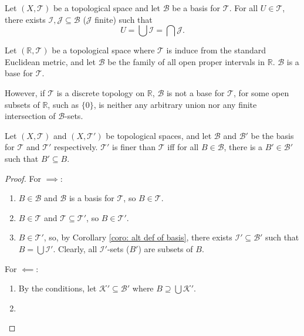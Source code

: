 \begin{corollary}
	\label{coro: alt def of basis}
	Let $(X, \mathcal T)$ be a topological space and let $\mathcal B$ be a basis for $\mathcal T$. For all $U \in \mathcal T$, there exists $\mathcal I, \mathcal J \subseteq \mathcal B$ ($\mathcal J$ finite) such that
	$$
	U = \bigcup \mathcal I = \bigcap \mathcal J.
	$$
\end{corollary}


\begin{example}
	Let $(\mathbb R, \mathcal T)$ be a topological space where $\mathcal T$ is induce from the standard Euclidean metric, and let $\mathcal B$ be the family of all open proper intervals in $\mathbb R$. $\mathcal B$ is a base for $\mathcal T$.
	
	However, if $\mathcal T$ is a discrete topology on $\mathbb R$, $\mathcal B$ is not a base for $\mathcal T$, for some open subsets of $\mathbb R$, such as $\{0\}$, is neither any arbitrary union nor any finite intersection of $\mathcal B$-sets.
\end{example}


\begin{theorem}
	Let $(X, \mathcal T)$ and $(X, \mathcal T')$ be topological spaces, and let $\mathcal B$ and $\mathcal B'$ be the basis for $\mathcal T$ and $\mathcal T'$ respectively. $\mathcal T'$ is finer than $\mathcal T$ iff for all $B \in \mathcal B$, there is a $B' \in \mathcal B'$ such that $B' \subseteq B$.
	\begin{proof}
		For $\implies$:
		
		\begin{enumerate}
			\item
			$B \in \mathcal B$ and $\mathcal B$ is a basis for $\mathcal T$, so $B \in \mathcal T$.
			
			\item
			$B \in \mathcal T$ and $\mathcal T \subseteq \mathcal T'$, so $B \in \mathcal T'$.
			
			\item
			$B \in \mathcal T'$, so, by Corollary \ref{coro: alt def of basis}, there exists $\mathcal I' \subseteq \mathcal B'$ such that $B = \bigcup \mathcal I'$. Clearly, all $\mathcal I'$-sets ($B'$) are subsets of $B$.
		\end{enumerate}
		
		For $\impliedby$:
		
		\begin{enumerate}
			\item
			By the conditions, let $\mathcal K' \subseteq \mathcal B'$ where $B \supseteq \bigcup \mathcal K'$.
			
			\item
			
		\end{enumerate}
	\end{proof}
\end{theorem}





